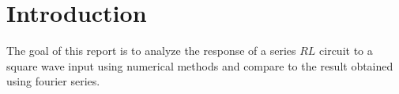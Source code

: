 \documentclass[12pt,a4paper]{report}
\begin{document}

\tableofcontents
\chapter{Introduction}
The goal of this report is to analyze the response of a series $RL$ circuit to a square wave input using numerical methods and compare to the result obtained using fourier series.
\end{document}
